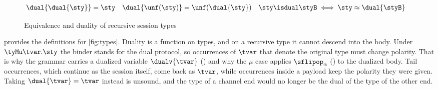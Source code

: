 \begin{figure}[tp]

  \begin{align*}
    \dual{\dual{\sty}} &= \sty
    &
    \dual{\unf(\sty)} &= \unf(\dual{\sty})
    &
    \sty \isdual \styB &\iff \sty \approx \dual{\styB}
  \end{align*}
  \caption{Equivalence and duality of recursive session types
    \quad {}}
  \label{fig:duality}
\end{figure}

 provides the definitions for \cref{fig:types}. Duality
\cite{LindleyM16} is a function on types, and on a recursive type it
cannot descend into the body. Under $\tyMu\tvar.\sty$ the binder stands
for the dual protocol, so occurrences of $\tvar$ that denote the
original type must change polarity. That is why the grammar carries a
dualized variable $\dualv{\tvar}$ () and why the $\mu$ case
applies $\sflipop_\alpha$ () to the dualized body. Tail
occurrences, which continue as the session itself, come back as
$\tvar$, while occurrences inside a payload keep the polarity they were
given. Taking $\dual{\tvar} = \tvar$ instead is unsound, and the type of
a channel end would no longer be the dual of the type of the other end.


